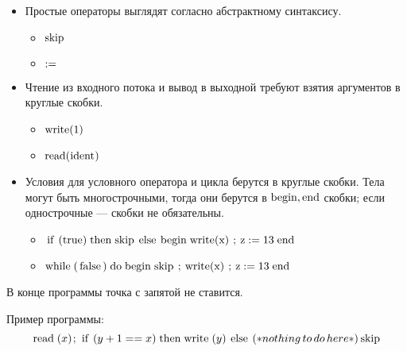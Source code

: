 \documentclass{article}
\newcommand{\llang}[1]{\mbox{\lstinline[mathescape]|#1|}}
\begin{document}
\begin{itemize}
    \item Простые операторы выглядят согласно абстрактному синтаксису.
    \begin{itemize}
        \item $\llang{skip}$
        \item $\llang{:=}$
    \end{itemize}
    \item Чтение из входного потока и вывод в выходной требуют взятия аргументов в круглые скобки.
    \begin{itemize}
      \item $\llang{write} (\llang{1})$
      \item $\llang{read} (\llang{ident})$
    \end{itemize}
    \item {Условия для условного оператора и цикла берутся в круглые скобки. Тела могут быть многострочными, тогда они берутся в $\llang{begin}, \llang{end}$ скобки; если однострочные --- скобки не обязательны. }
    \begin{itemize}
        \item $\llang{if}\;(\llang{true})\;\llang{then}\;\llang{skip}\;\llang{else}\;\llang{begin}\;\llang{write} (\llang{x})\;\llang{;}\;\llang{z}\;\llang{:=}\;\llang{13}\;\llang{end}$
        \item  $\llang{while}\;(\llang{false})\;\llang{do}\;\llang{begin} \;\llang{skip}\;\llang{;}\;\llang{write} (\llang{x})\;\llang{;}\;\llang{z}\;\llang{:=}\;\llang{13}\;\llang{end}$
    \end{itemize}
\end{itemize}

В конце программы точка с запятой не ставится. 

Пример программы: 
$$
\llang{read}\; (x) \llang{;} \; \llang{if} \; (y + 1 == x)  \; \llang{then} \; \llang{write} \; (y) \; \llang{else} \; (* nothing \, to \, do \, here *) \, \llang{skip} 
$$
\end{document}
